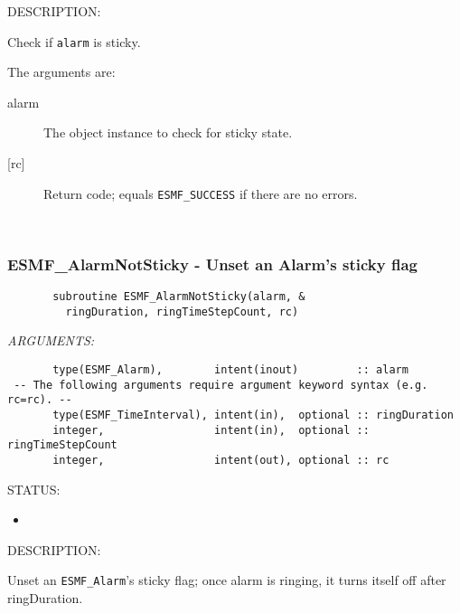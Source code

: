{\sf DESCRIPTION:\\ }


       Check if {\tt alarm} is sticky.
  
       The arguments are:
       \begin{description}
       \item[alarm]
            The object instance to check for sticky state.
       \item[{[rc]}]
            Return code; equals {\tt ESMF\_SUCCESS} if there are no errors.
       \end{description} 
 
\mbox{}\hrulefill\ 
 
\subsubsection [ESMF\_AlarmNotSticky] {ESMF\_AlarmNotSticky - Unset an Alarm's sticky flag}


 
 
\begin{verbatim}       subroutine ESMF_AlarmNotSticky(alarm, &
         ringDuration, ringTimeStepCount, rc)
 \end{verbatim}{\em ARGUMENTS:}
\begin{verbatim}       type(ESMF_Alarm),        intent(inout)         :: alarm
 -- The following arguments require argument keyword syntax (e.g. rc=rc). --
       type(ESMF_TimeInterval), intent(in),  optional :: ringDuration
       integer,                 intent(in),  optional :: ringTimeStepCount
       integer,                 intent(out), optional :: rc
 \end{verbatim}
{\sf STATUS:}
   \begin{itemize}
   \item{}
   \end{itemize}
  
{\sf DESCRIPTION:\\ }


       Unset an {\tt ESMF\_Alarm}'s sticky flag; once alarm is ringing,
       it turns itself off after ringDuration.
  
